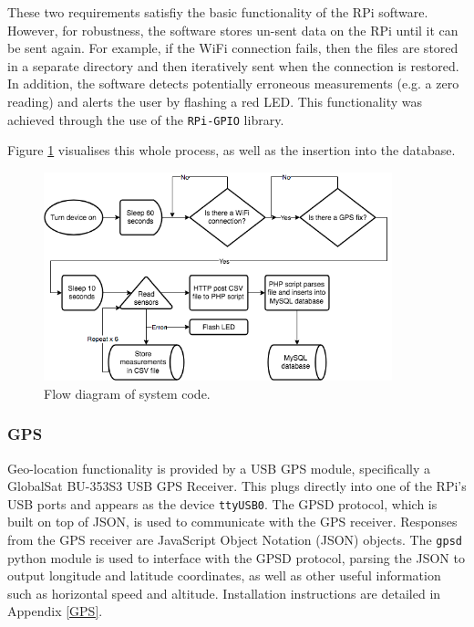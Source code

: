 \documentclass[11pt,twosided,a4paper]{report}
\begin{document}
These two requirements satisfiy the basic functionality of the RPi software. However, for robustness, the software stores un-sent data on the RPi until it can be sent again. For example, if the WiFi connection fails, then the files are stored in a separate directory and then iteratively sent when the connection is restored. In addition, the software detects potentially erroneous measurements (e.g. a zero reading) and alerts the user by flashing a red LED. This functionality was achieved through the use of the \texttt{RPi-GPIO} library. 


Figure \ref{code_flow} visualises this whole process, as well as the insertion into the database.


\begin{figure}[!tb]
\centering
\includegraphics[width=0.9\textwidth]{images/code_flow}
\caption[Flow diagram of system code.]{Flow diagram of system code.}
\label{code_flow}
\end{figure}

\subsubsection{GPS}

Geo-location functionality is provided by a USB GPS module, specifically a GlobalSat BU-353S3 USB GPS Receiver. This plugs directly into one of the RPi's USB ports and appears as the device \texttt{ttyUSB0}. The GPSD protocol, which is built on top of JSON, is used to communicate with the GPS receiver. Responses from the GPS receiver are JavaScript Object Notation (JSON) objects. The \texttt{gpsd} python module is used to interface with the GPSD protocol, parsing the JSON to output longitude and latitude coordinates, as well as other useful information such as horizontal speed and altitude. Installation instructions are detailed in Appendix \ref{GPS}.
\end{document}
